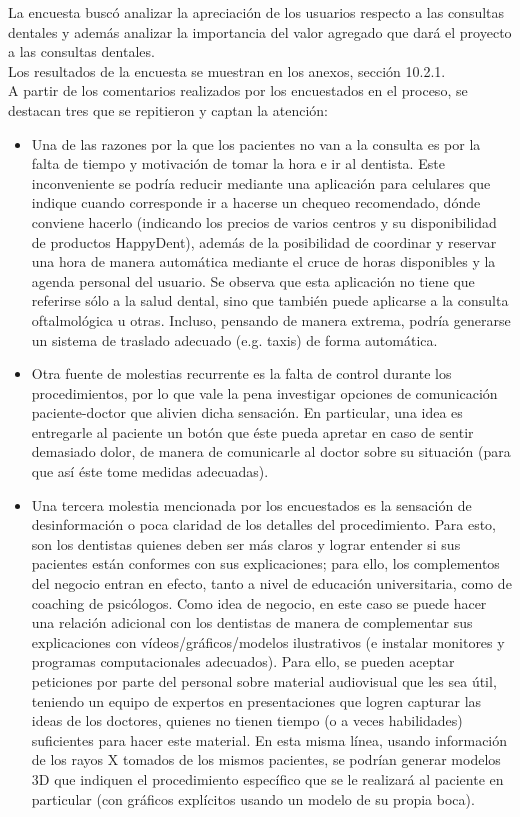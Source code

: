 \documentclass[letterpaper,12pt]{article}
\begin{document}
La encuesta buscó analizar la apreciación de los usuarios respecto a las consultas dentales y 
además analizar la importancia del valor agregado que dará el proyecto a las consultas dentales. 
\\[0.5cm]
\indent Los resultados de la encuesta se muestran en los anexos, sección 10.2.1. 
\\[0.5cm]
\indent A partir de los comentarios realizados por los encuestados en el proceso, se destacan tres 
que se repitieron y captan la atención:

			\begin{itemize}
				\setlength{\itemsep}{0pt}%
				\setlength{\parskip}{0pt}%
				\item Una de las razones por la que los pacientes no van a la consulta es por la falta de tiempo y motivación de tomar la hora e ir al dentista. Este inconveniente se podría reducir mediante una aplicación para celulares que indique cuando corresponde ir a hacerse un chequeo recomendado, dónde conviene hacerlo (indicando los precios de varios centros y su disponibilidad de productos HappyDent), además de la posibilidad de coordinar y reservar una hora de manera automática mediante el cruce de horas disponibles y la agenda personal del usuario. Se observa que esta aplicación no tiene que referirse sólo a la salud dental, sino que también puede aplicarse a la consulta oftalmológica u otras. Incluso, pensando de manera extrema, podría generarse un sistema de traslado adecuado (e.g. taxis) de forma automática.
				\item Otra fuente de molestias recurrente es la falta de control durante los procedimientos, por lo que vale la pena investigar opciones de comunicación paciente-doctor que alivien dicha sensación. En particular, una idea es entregarle al paciente un botón que éste pueda apretar en caso de sentir demasiado dolor, de manera de comunicarle al doctor sobre su situación (para que así éste tome medidas adecuadas).
				\item Una tercera molestia mencionada por los encuestados es la sensación de desinformación o poca claridad de los detalles del procedimiento. Para esto, son los dentistas quienes deben ser más claros y lograr entender si sus pacientes están conformes con sus explicaciones; para ello, los complementos del negocio entran en efecto, tanto a nivel de educación universitaria, como de coaching de psicólogos. Como idea de negocio, en este caso se puede hacer una relación adicional con los dentistas de manera de complementar sus explicaciones con vídeos/gráficos/modelos ilustrativos (e instalar monitores y programas computacionales adecuados). Para ello, se pueden aceptar peticiones por parte del personal sobre material audiovisual que les sea útil, teniendo un equipo de expertos en presentaciones que logren capturar las ideas de los doctores, quienes no tienen tiempo (o a veces habilidades) suficientes para hacer este material. En esta misma línea, usando información de los rayos X tomados de los mismos pacientes, se podrían generar modelos 3D que indiquen el procedimiento específico que se le realizará al paciente en particular (con gráficos explícitos usando un modelo de su propia boca).
			\end{itemize}
\end{document}
